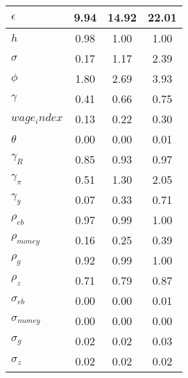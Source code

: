 \begin{tabular}{|l|c|c|c|}
\textbf{$\epsilon$}&9.94&14.92&22.01\\\hline
\textbf{$h$}&0.98&1.00&1.00\\\hline
\textbf{$\sigma$}&0.17&1.17&2.39\\\hline
\textbf{$\phi$}&1.80&2.69&3.93\\\hline
\textbf{$\gamma$}&0.41&0.66&0.75\\\hline
\textbf{$wage_index$}&0.13&0.22&0.30\\\hline
\textbf{$\theta$}&0.00&0.00&0.01\\\hline
\textbf{$\gamma_R$}&0.85&0.93&0.97\\\hline
\textbf{$\gamma_{\pi}$}&0.51&1.30&2.05\\\hline
\textbf{$\gamma_y$}&0.07&0.33&0.71\\\hline
\textbf{$\rho_{eb}$}&0.97&0.99&1.00\\\hline
\textbf{$\rho_{money}$}&0.16&0.25&0.39\\\hline
\textbf{$\rho_{g}$}&0.92&0.99&1.00\\\hline
\textbf{$\rho_{z}$}&0.71&0.79&0.87\\\hline
\textbf{$\sigma_{eb}$}&0.00&0.00&0.01\\\hline
\textbf{$\sigma_{money}$}&0.00&0.00&0.00\\\hline
\textbf{$\sigma_{g}$}&0.02&0.02&0.03\\\hline
\textbf{$\sigma_{z}$}&0.02&0.02&0.02\\\hline
\end{tabular}
